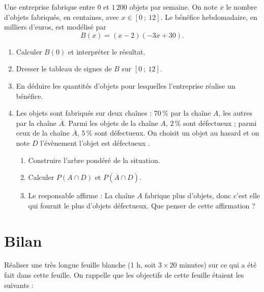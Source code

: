 \documentclass[10pt,a4paper]{article}
\begin{document}
\begin{exo}
Une entreprise fabrique entre \(0\) et \(1\,200\) objets par semaine. On note \(x\) le nombre d'objets fabriqués, en centaines, avec \(x\in[0\ ;\ 12]\). Le bénéfice hebdomadaire, en milliers d'euros, est modélisé par
\[ B(x)=(x-2)(-3x+30). \]
\begin{enumerate}[leftmargin=*]
    \item Calculer \(B(0)\) et interpréter le résultat.
    \item Dresser le tableau de signes de \(B\) sur \([0\ ;\ 12]\).
    \item En déduire les quantités d'objets pour lesquelles l'entreprise réalise un bénéfice.
    \item Les objets sont fabriqués sur deux chaînes : \(70\,\%\) par la chaîne \(A\), les autres par la chaîne \(\overline{A}\). Parmi les objets de la chaîne \(A\), \(2\,\%\) sont défectueux ; parmi ceux de la chaîne \(\overline{A}\), \(5\,\%\) sont défectueux. On choisit un objet au hasard et on note \(D\) l'évènement \og l'objet est défectueux \fg{}.
    \begin{enumerate}
        \item Construire l'arbre pondéré de la situation.
        \item Calculer \(P(A\cap D)\) et \(P(\overline{A}\cap D)\).
        \item Le responsable affirme : \og La chaîne \(A\) fabrique plus d'objets, donc c'est elle qui fournit le plus d'objets défectueux. \fg{} Que penser de cette affirmation ?
    \end{enumerate}
\end{enumerate}
\end{exo}


\section{Bilan}

Réaliser une très longue feuille blanche (1 h, soit \(3\times 20\) minutes) sur ce qui a été fait dans cette feuille. On rappelle que les objectifs de cette feuille étaient les suivants :

\medskip
\end{document}
